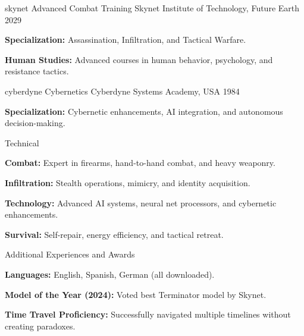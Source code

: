 \documentclass[
    a4paper, 
    fontsize=11pt, 
    pagemargin=.8in,
    timelineindent=1cm,
    smallskip=.4cm,
    bigskip=.8cm,
    primarycolor=E50914,
    backgroundcolor=000000,
    textprimarycolor=FFFFFF,
    textsecondarycolor=BBBBBB,
]{concise-cv}
\begin{document}
\begin{cv}
{\begin{cvEnum}
            \end{cvEnum}
        }
    \educationentry
        {skynet}
        {Advanced Combat Training \textendash\space Skynet Institute of Technology, Future Earth}
        {2029}
        {
            \begin{cvEnum}
                \item \textbf{Specialization:} Assassination, Infiltration, and Tactical Warfare.
                \item \textbf{Human Studies:} Advanced courses in human behavior, psychology, and resistance tactics.
            \end{cvEnum}
        }
    \educationentry
        {cyberdyne}
        {Cybernetics \textendash\space Cyberdyne Systems Academy, USA}
        {1984}
        {
            \begin{cvEnum}
                \item \textbf{Specialization:} Cybernetic enhancements, AI integration, and autonomous decision-making.
            \end{cvEnum}
        }
    \skillsentry
        {Technical}
        {
            \begin{cvEnum}
                \item \textbf{Combat:} Expert in firearms, hand-to-hand combat, and heavy weaponry.
                \item \textbf{Infiltration:} Stealth operations, mimicry, and identity acquisition.
                \item \textbf{Technology:} Advanced AI systems, neural net processors, and cybernetic enhancements.
                \item \textbf{Survival:} Self-repair, energy efficiency, and tactical retreat.
            \end{cvEnum}
        }
    \skillsentry
        {Additional Experiences and Awards}
        {
            \begin{cvEnum}
                \item \textbf{Languages:} English, Spanish, German (all downloaded).
                \item \textbf{Model of the Year (2024):} Voted best Terminator model by Skynet.
                \item \textbf{Time Travel Proficiency:} Successfully navigated multiple timelines without creating paradoxes.
            \end{cvEnum}
        }

\end{cv}
\end{document}
